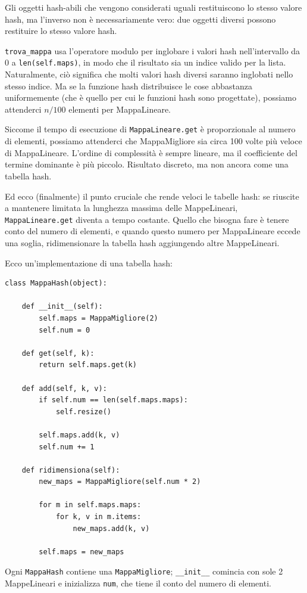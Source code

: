 \documentclass[10pt]{book}
\begin{document}
Gli oggetti hash-abili che vengono considerati uguali restituiscono lo stesso valore hash, ma l'inverso non è necessariamente vero: due oggetti diversi possono restituire lo stesso valore hash.

\verb"trova_mappa" usa l'operatore modulo per inglobare i valori hash nell'intervallo da 0 a {\tt len(self.maps)}, in modo che il risultato sia un indice valido per la lista. Naturalmente, ciò significa che molti valori hash diversi saranno inglobati nello stesso indice. Ma se la funzione hash distribuisce le cose abbastanza uniformemente (che è quello per cui le funzioni hash sono progettate), possiamo attenderci $n/100$ elementi per MappaLineare.

Siccome il tempo di esecuzione di {\tt MappaLineare.get} è proporzionale al numero di elementi, possiamo attenderci che MappaMigliore sia circa 100 volte più veloce di MappaLineare. L'ordine di complessità è sempre lineare, ma il coefficiente del termine dominante è più piccolo. Risultato discreto, ma non ancora come una tabella hash.

Ed ecco (finalmente) il punto cruciale che rende veloci le tabelle hash: se riuscite a mantenere limitata la lunghezza massima delle MappeLineari, {\tt
  MappaLineare.get} diventa a tempo costante.  Quello che bisogna fare è tenere conto del numero di elementi, e quando questo numero per MappaLineare eccede una soglia, ridimensionare la tabella hash aggiungendo altre MappeLineari.

Ecco un'implementazione di una tabella hash:

\begin{verbatim}
class MappaHash(object):

    def __init__(self):
        self.maps = MappaMigliore(2)
        self.num = 0

    def get(self, k):
        return self.maps.get(k)

    def add(self, k, v):
        if self.num == len(self.maps.maps):
            self.resize()

        self.maps.add(k, v)
        self.num += 1

    def ridimensiona(self):
        new_maps = MappaMigliore(self.num * 2)

        for m in self.maps.maps:
            for k, v in m.items:
                new_maps.add(k, v)

        self.maps = new_maps
\end{verbatim}

Ogni {\tt MappaHash} contiene una {\tt MappaMigliore}; \verb"__init__" comincia con sole 2 MappeLineari e inizializza {\tt num}, che tiene il conto del numero di elementi.
\end{document}
